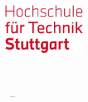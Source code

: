 \begin{titlepage}
	\begin{addmargin}[-1cm]{-3cm}
    \begin{center}
        \large
        \includegraphics[width=3cm]{gfx/hft_logo} \\ \medskip  

        \hfill

        \vfill

        \begingroup
            \color{Maroon}\spacedallcaps{\myTitle} \\ \bigbreak
        \endgroup
        \mySubtitle
        \vfill 

        \spacedlowsmallcaps{\myName}


        

          

        \myTime\ -- \myVersion

        \vfill                      

    \end{center}  
  \end{addmargin}       
\end{titlepage}   
